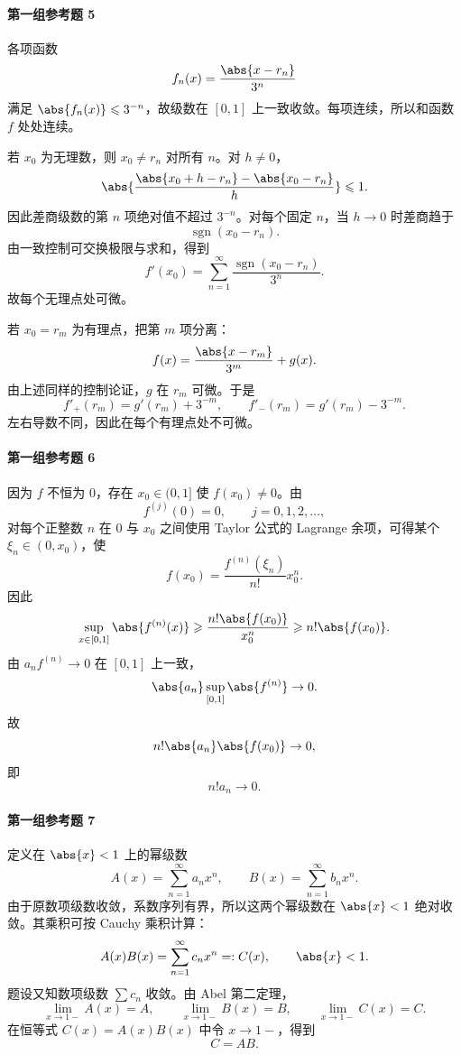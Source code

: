 \paragraph{第一组参考题 5}
\begin{xsolution}
各项函数
\[
  f_n(x)=\frac{\abs{x-r_n}}{3^n}
\]
满足 $\abs{f_n(x)}\leqslant3^{-n}$，故级数在 $[0,1]$ 上一致收敛。每项连续，所以和函数 $f$ 处处连续。

若 $x_0$ 为无理数，则 $x_0\ne r_n$ 对所有 $n$。对 $h\ne0$，
\[
  \abs{
  \frac{\abs{x_0+h-r_n}-\abs{x_0-r_n}}h}
  \leqslant1.
\]
因此差商级数的第 $n$ 项绝对值不超过 $3^{-n}$。对每个固定 $n$，当 $h\to0$ 时差商趋于
\[
  \operatorname{sgn}(x_0-r_n).
\]
由一致控制可交换极限与求和，得到
\[
  f'(x_0)=\sum_{n=1}^{\infty}
  \frac{\operatorname{sgn}(x_0-r_n)}{3^n}.
\]
故每个无理点处可微。

若 $x_0=r_m$ 为有理点，把第 $m$ 项分离：
\[
  f(x)=\frac{\abs{x-r_m}}{3^m}+g(x).
\]
由上述同样的控制论证，$g$ 在 $r_m$ 可微。于是
\[
  f'_+(r_m)=g'(r_m)+3^{-m},
  \qquad
  f'_-(r_m)=g'(r_m)-3^{-m}.
\]
左右导数不同，因此在每个有理点处不可微。
\end{xsolution}

\paragraph{第一组参考题 6}
\begin{xsolution}
因为 $f$ 不恒为 $0$，存在 $x_0\in(0,1]$ 使 $f(x_0)\ne0$。由
\[
  f^{(j)}(0)=0,
  \qquad j=0,1,2,\ldots,
\]
对每个正整数 $n$ 在 $0$ 与 $x_0$ 之间使用 Taylor 公式的 Lagrange 余项，可得某个 $\xi_n\in(0,x_0)$，使
\[
  f(x_0)=\frac{f^{(n)}(\xi_n)}{n!}x_0^n.
\]
因此
\[
  \sup_{x\in[0,1]}\abs{f^{(n)}(x)}
  \geqslant\frac{n!\abs{f(x_0)}}{x_0^n}
  \geqslant n!\abs{f(x_0)}.
\]
由 $a_nf^{(n)}\to0$ 在 $[0,1]$ 上一致，
\[
  \abs{a_n}\sup_{[0,1]}\abs{f^{(n)}}\to0.
\]
故
\[
  n!\abs{a_n}\abs{f(x_0)}\to0,
\]
即
\[
  \boxed{n!a_n\to0}.
\]
\end{xsolution}

\paragraph{第一组参考题 7}
\begin{xsolution}
定义在 $\abs{x}<1$ 上的幂级数
\[
  A(x)=\sum_{n=1}^{\infty}a_nx^n,
  \qquad
  B(x)=\sum_{n=1}^{\infty}b_nx^n.
\]
由于原数项级数收敛，系数序列有界，所以这两个幂级数在 $\abs{x}<1$ 绝对收敛。其乘积可按 Cauchy 乘积计算：
\[
  A(x)B(x)=\sum_{n=1}^{\infty}c_nx^n=:C(x),
  \qquad \abs{x}<1.
\]
题设又知数项级数 $\sum c_n$ 收敛。由 Abel 第二定理，
\[
  \lim_{x\to1-}A(x)=A,
  \qquad
  \lim_{x\to1-}B(x)=B,
  \qquad
  \lim_{x\to1-}C(x)=C.
\]
在恒等式 $C(x)=A(x)B(x)$ 中令 $x\to1-$，得到
\[
  \boxed{C=AB}.
\]
\end{xsolution}


